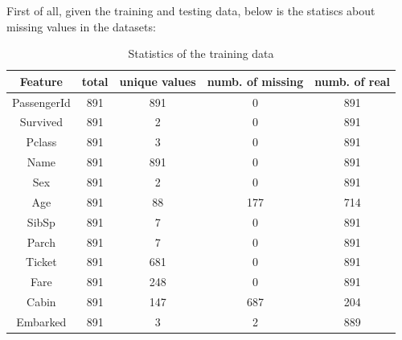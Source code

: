 First of all, given the training and testing data, below is the statiscs about missing values in the datasets:
\begin{table}[H]
    \centering
    \begin{tabular}{|c|c|c|c|c|}
        \hline 
        Feature    &total       &unique values  &numb. of missing  &numb. of real   \\
        \hline
        PassengerId &891         &891         &0           &891             \\
        Survived    &891         &2           &0           &891             \\
        Pclass      &891         &3           &0           &891             \\
        Name        &891         &891         &0           &891             \\
        Sex         &891         &2           &0           &891             \\
        Age         &891         &88          &177         &714             \\
        SibSp       &891         &7           &0           &891             \\
        Parch       &891         &7           &0           &891             \\
        Ticket      &891         &681         &0           &891             \\
        Fare        &891         &248         &0           &891             \\
        Cabin       &891         &147         &687         &204             \\
        Embarked    &891         &3           &2           &889             \\
        \hline
    \end{tabular}
    \caption{Statistics of the training data}
    \label{statistics of the training data}
\end{table}

